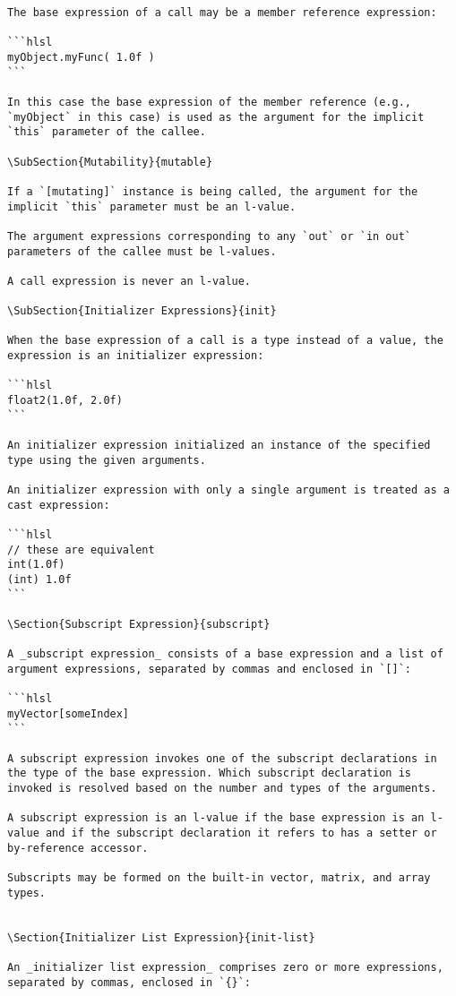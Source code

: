 \begin{verbatim}
The base expression of a call may be a member reference expression:

```hlsl
myObject.myFunc( 1.0f )
```

In this case the base expression of the member reference (e.g., `myObject` in this case) is used as the argument for the implicit `this` parameter of the callee.

\SubSection{Mutability}{mutable}

If a `[mutating]` instance is being called, the argument for the implicit `this` parameter must be an l-value.

The argument expressions corresponding to any `out` or `in out` parameters of the callee must be l-values.

A call expression is never an l-value.

\SubSection{Initializer Expressions}{init}

When the base expression of a call is a type instead of a value, the expression is an initializer expression:

```hlsl
float2(1.0f, 2.0f)
```

An initializer expression initialized an instance of the specified type using the given arguments.

An initializer expression with only a single argument is treated as a cast expression:

```hlsl
// these are equivalent
int(1.0f)
(int) 1.0f
```

\Section{Subscript Expression}{subscript}

A _subscript expression_ consists of a base expression and a list of argument expressions, separated by commas and enclosed in `[]`:

```hlsl
myVector[someIndex]
```

A subscript expression invokes one of the subscript declarations in the type of the base expression. Which subscript declaration is invoked is resolved based on the number and types of the arguments.

A subscript expression is an l-value if the base expression is an l-value and if the subscript declaration it refers to has a setter or by-reference accessor.

Subscripts may be formed on the built-in vector, matrix, and array types.


\Section{Initializer List Expression}{init-list}

An _initializer list expression_ comprises zero or more expressions, separated by commas, enclosed in `{}`:


\end{verbatim}

